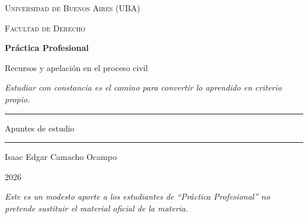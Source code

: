 \documentclass[12pt,oneside]{book}
\newcommand{\universidad}{Universidad de Buenos Aires (UBA)}
\newcommand{\facultad}{Facultad de Derecho}
\newcommand{\materia}{Práctica Profesional}
\newcommand{\titulo}{Recursos y apelación en el proceso civil}
\newcommand{\autor}{Isaac Edgar Camacho Ocampo}
\newcommand{\anio}{2026}
\begin{document}
\begin{titlepage}

\thispagestyle{empty}

\begin{center}

\vspace*{1cm}

{\large \textsc{\universidad}}

\vspace{0.2cm}

{\large \textsc{\facultad}}

\vspace{3cm}

{\Huge \textbf{\materia}}

\vspace{1cm}

{\LARGE \titulo}

\vspace{0.8cm}

{\small \textit{Estudiar con constancia es el camino para convertir lo aprendido en criterio propio.}}

\vspace{1.2cm}

\rule{0.70\textwidth}{0.5pt}

\vspace{0.5cm}

{\large Apuntes de estudio}

\vspace{0.5cm}

\rule{0.70\textwidth}{0.5pt}

\vfill

{\large \autor}

\vspace{0.3cm}

{\large \anio}

\end{center}

\vfill

\begin{flushleft}
\textit{Este es un modesto aporte a los estudiantes de ``Práctica Profesional'' no pretende sustituir el material oficial de la materia.}
\end{flushleft}

\end{titlepage}

\frontmatter
\tableofcontents
\mainmatter
\end{document}
